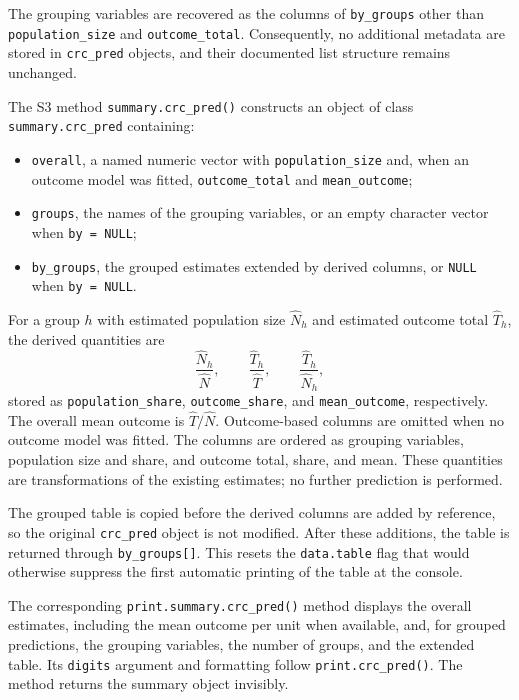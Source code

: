 \documentclass[11pt,letterpaper]{article}
\begin{document}
The grouping variables are recovered as the columns of \texttt{by\_groups}
other than \texttt{population\_size} and \texttt{outcome\_total}. Consequently,
no additional metadata are stored in \texttt{crc\_pred} objects, and their
documented list structure remains unchanged.

The S3 method \texttt{summary.crc\_pred()} constructs an object of class
\texttt{summary.crc\_pred} containing:

\begin{itemize}
  \item \texttt{overall}, a named numeric vector with
  \texttt{population\_size} and, when an outcome model was fitted,
  \texttt{outcome\_total} and \texttt{mean\_outcome};
  \item \texttt{groups}, the names of the grouping variables, or an empty
  character vector when \texttt{by = NULL};
  \item \texttt{by\_groups}, the grouped estimates extended by derived
  columns, or \texttt{NULL} when \texttt{by = NULL}.
\end{itemize}

For a group $h$ with estimated population size $\widehat N_h$ and estimated
outcome total $\widehat T_h$, the derived quantities are
\[
  \frac{\widehat N_h}{\widehat N}, \qquad
  \frac{\widehat T_h}{\widehat T}, \qquad
  \frac{\widehat T_h}{\widehat N_h},
\]
stored as \texttt{population\_share}, \texttt{outcome\_share}, and
\texttt{mean\_outcome}, respectively. The overall mean outcome is
$\widehat T/\widehat N$. Outcome-based columns are omitted when no outcome
model was fitted. The columns are ordered as grouping variables, population
size and share, and outcome total, share, and mean. These quantities are
transformations of the existing estimates; no further prediction is performed.

The grouped table is copied before the derived columns are added by reference,
so the original \texttt{crc\_pred} object is not modified. After these
additions, the table is returned through \texttt{by\_groups[]}. This resets the
\texttt{data.table} flag that would otherwise suppress the first automatic
printing of the table at the console.

The corresponding \texttt{print.summary.crc\_pred()} method displays the
overall estimates, including the mean outcome per unit when available, and,
for grouped predictions, the grouping variables, the number of groups, and the
extended table. Its \texttt{digits} argument and formatting follow
\texttt{print.crc\_pred()}. The method returns the summary object invisibly.
\end{document}
